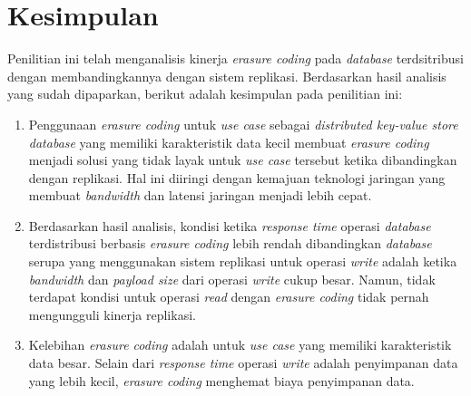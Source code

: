 \section{Kesimpulan}
\label{sec:kesimpulan}

Penilitian ini telah menganalisis kinerja \textit{erasure coding} pada \textit{database} terdsitribusi dengan membandingkannya dengan sistem replikasi. Berdasarkan hasil analisis yang sudah dipaparkan, berikut adalah kesimpulan pada penilitian ini:

\begin{enumerate}
  \item Penggunaan \textit{erasure coding} untuk \textit{use case} sebagai \textit{distributed key-value store database} yang memiliki karakteristik data kecil membuat \textit{erasure coding} menjadi solusi yang tidak layak untuk \textit{use case} tersebut ketika dibandingkan dengan replikasi. Hal ini diiringi dengan kemajuan teknologi jaringan yang membuat \textit{bandwidth} dan latensi jaringan menjadi lebih cepat.
  \item Berdasarkan hasil analisis, kondisi ketika \textit{response time} operasi \textit{database} terdistribusi berbasis \textit{erasure coding} lebih rendah dibandingkan \textit{database} serupa yang menggunakan sistem replikasi untuk operasi \textit{write} adalah ketika \textit{bandwidth} dan \textit{payload size} dari operasi \textit{write} cukup besar. Namun, tidak terdapat kondisi untuk operasi \textit{read} dengan \textit{erasure coding} tidak pernah mengungguli kinerja replikasi.
  \item Kelebihan \textit{erasure coding} adalah untuk \textit{use case} yang memiliki karakteristik data besar. Selain dari \textit{response time} operasi \textit{write} adalah penyimpanan data yang lebih kecil, \textit{erasure coding} menghemat biaya penyimpanan data.
\end{enumerate}

